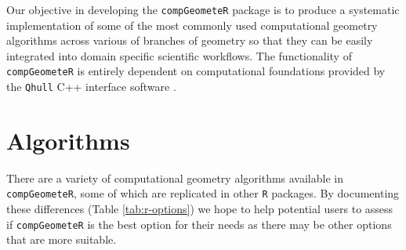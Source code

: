 \documentclass[12pt, a4paper]{article}
\begin{document}
Our objective in developing the \texttt{compGeometeR} package is to produce a systematic implementation of some of the most commonly used computational geometry algorithms across various of branches of geometry so that they can be easily integrated into domain specific scientific workflows.  The functionality of \texttt{compGeometeR} is entirely dependent on computational foundations provided by the \texttt{Qhull} C++ interface software \citep{barber-1996}.

\section{Algorithms}

There are a variety of computational geometry algorithms available in \texttt{compGeometeR}, some of which are replicated in other \texttt{R} packages.  By documenting these differences (Table \ref{tab:r-options}) we hope to help potential users to assess if \texttt{compGeometeR} is the best option for their needs as there may be other options that are more suitable.
\end{document}

